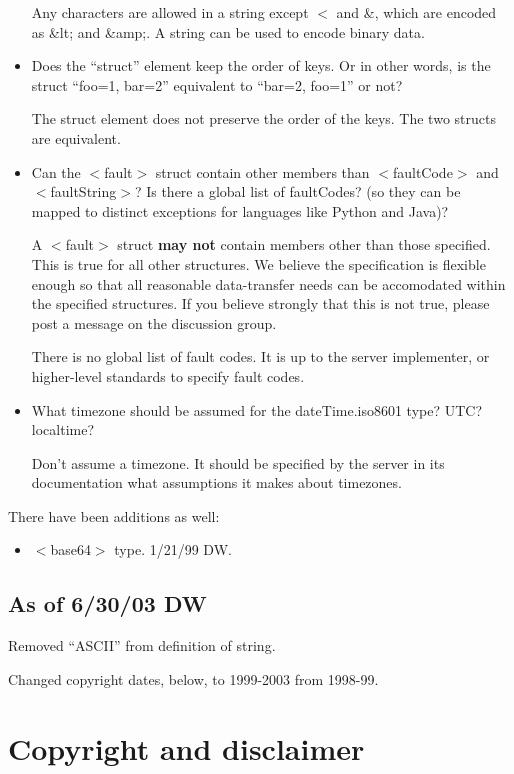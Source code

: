 \begin{itemize}
Any characters are allowed in a string except $<$ and \&, which are encoded as \&lt; and \&amp;. A string can be used to encode binary data.

\item Does the ``struct'' element keep the order of keys. Or in other words, is the struct ``foo=1, bar=2'' equivalent to ``bar=2, foo=1'' or not? 

The struct element does not preserve the order of the keys. The two structs are equivalent.

\item Can the $<$fault$>$ struct contain other members than $<$faultCode$>$ and $<$faultString$>$? Is there a global list of faultCodes? (so they can be mapped to distinct exceptions for languages like Python and Java)? 

A $<$fault$>$ struct \textbf{may not}
contain members other than those specified. This is true for all other structures. We believe the specification is flexible enough so that all reasonable data-transfer needs can be accomodated within the specified structures. If you believe strongly that this is not true, please post a message on the discussion group.

There is no global list of fault codes. It is up to the server implementer, or higher-level standards to specify fault codes.

\item What timezone should be assumed for the dateTime.iso8601 type? UTC? localtime? 

Don't assume a timezone. It should be specified by the server in its documentation what assumptions it makes about timezones.
\end{itemize}

There have been additions as well:
\begin{itemize}
\item $<$base64$>$ type. 1/21/99 DW.
\end{itemize}

\subsection{As of 6/30/03 DW}

Removed ``ASCII'' from definition of string.

Changed copyright dates, below, to 1999-2003 from 1998-99.


%
%

\section{Copyright and disclaimer}

